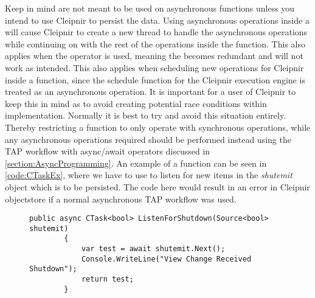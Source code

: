 Keep in mind  are not meant to be used on asynchronous functions unless you intend to use Cleipnir to persist the data. Using asynchronous operations inside a  will cause Cleipnir to create a new thread to handle the asynchronous operations while continuing on with the rest of the operations inside the function. This also applies when the  operator is used, meaning the  becomes redundant and will not work as intended. This also applies when scheduling new operations for Cleipnir inside a  function, since the schedule function for the Cleipnir execution engine is treated as an asynchronous operation. It is important for a user of Cleipnir to keep this in mind as to avoid creating potential race conditions within implementation. Normally it is best to try and avoid this situation entirely. Thereby restricting a  function to only operate with synchronous operations, while any asynchronous operations required should be performed instead using the TAP workflow with async/await operators discussed in \autoref{section:AsyncProgramming}. An example of a  function can be seen in \autoref{code:CTaskEx}, where we have to use  to listen for new items in the \emph{shutemit}  object which is to be persisted. The code here would result in an error in Cleipnir objectstore if a normal asynchronous TAP workflow was used.

\begin{figure}[h]
	\centering
	\begin{lstlisting}[label = code:CTaskEx, caption= Example of a CTask function, captionpos = b, basicstyle=\scriptsize]
	public async CTask<bool> ListenForShutdown(Source<bool> shutemit)
        {
            var test = await shutemit.Next();
            Console.WriteLine("View Change Received Shutdown");
            return test;
        }
	\end{lstlisting}
\end{figure}